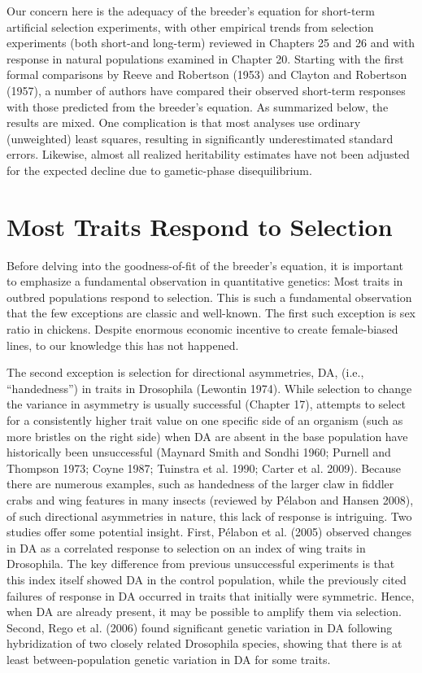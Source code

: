 \documentclass{article}
\begin{document}
Our concern here is the adequacy of the breeder's equation for short-term artificial selection experiments, with other empirical trends from selection experiments (both short-and long-term) reviewed in Chapters 25 and 26 and with response in natural populations examined in Chapter 20. Starting with the first formal comparisons by Reeve and Robertson (1953) and Clayton and Robertson (1957), a number of authors have compared their observed short-term responses with those predicted from the breeder's equation. As summarized below, the results are mixed. One complication is that most analyses use ordinary (unweighted) least squares, resulting in significantly underestimated standard errors. Likewise, almost all realized heritability estimates have not been adjusted for the expected decline due to gametic-phase disequilibrium.

\section{Most Traits Respond to Selection}
Before delving into the goodness-of-fit of the breeder's equation, it is important to emphasize a fundamental observation in quantitative genetics: Most traits in outbred populations respond to selection. This is such a fundamental observation that the few exceptions are classic and well-known. The first such exception is sex ratio in chickens. Despite enormous economic incentive to create female-biased lines, to our knowledge this has not happened.

The second exception is selection for directional asymmetries, DA, (i.e., “handedness”) in traits in Drosophila (Lewontin 1974). While selection to change the variance in asymmetry is usually successful (Chapter 17), attempts to select for a consistently higher trait value on one specific side of an organism (such as more bristles on the right side) when DA are absent in the base population have historically been unsuccessful (Maynard Smith and Sondhi 1960; Purnell and Thompson 1973; Coyne 1987; Tuinstra et al. 1990; Carter et al. 2009). Because there are numerous examples, such as handedness of the larger claw in fiddler crabs and wing features in many insects (reviewed by Pélabon and Hansen 2008), of such directional asymmetries in nature, this lack of response is intriguing. Two studies offer some potential insight. First, Pélabon et al. (2005) observed changes in DA as a correlated response to selection on an index of wing traits in Drosophila. The key difference from previous unsuccessful experiments is that this index itself showed DA in the control population, while the previously cited failures of response in DA occurred in traits that initially were symmetric. Hence, when DA are already present, it may be possible to amplify them via selection. Second, Rego et al. (2006) found significant genetic variation in DA following hybridization of two closely related Drosophila species, showing that there is at least between-population genetic variation in DA for some traits.
\end{document}
